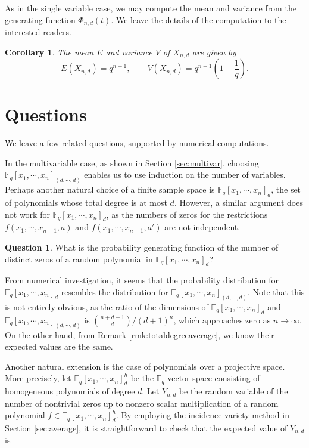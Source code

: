 \documentclass[12pt]{amsart}
\newtheorem{corollary}[theorem]{Corollary}
\theoremstyle{definition}
\newtheorem{question}[theorem]{Question}
\newcommand{\FF}{\mathbb{F} }
\begin{document}
As in the single variable case, we may compute the mean and variance from the generating function $\Phi_{n,d}(t)$. We leave the details of the computation to the interested readers. 

\begin{corollary}\label{corr: meanandvarn}
The mean $E$ and variance $V$ of $X_{n,d}$ are given by 
\[
    E(X_{n,d}) = q^{n-1}, \qquad V(X_{n,d}) = q^{n-1}\left(1 - \frac{1}{q}\right).
\]
\end{corollary}





\section{Questions}\label{sec:questions}

We leave a few related questions, supported by numerical computations. 

In the multivariable case, as shown in Section \ref{sec:multivar}, choosing $\FF_q[x_1, \cdots, x_n]_{(d, \cdots, d)}$ enables us to use induction on the number of variables. Perhaps another natural choice of a finite sample space is $\FF_q[x_1, \cdots, x_n]_d$, the set of polynomials whose total degree is at most $d$. However, a similar argument does not work for $\FF_q[x_1, \cdots, x_n]_d$, as the numbers of zeros for the restrictions $f(x_1, \cdots, x_{n-1}, a)$ and $f(x_1, \cdots, x_{n-1}, a')$ are not independent.

\begin{question}\label{que:totaldegree}
What is the probability generating function of the number of distinct zeros of a random polynomial in $\FF_q[x_1, \cdots, x_n]_d$?
\end{question}

From numerical investigation, it seems that the probability distribution for $\FF_q[x_1, \cdots, x_n]_d$ resembles the distribution for $\FF_q[x_1, \cdots, x_n]_{(d, \cdots , d)}$. Note that this is not entirely obvious, as the ratio of the dimensions of $\FF_q[x_1, \cdots, x_n]_d$ and $\FF_q[x_1, \cdots, x_n]_{(d, \cdots, d)}$ is ${n +d -1 \choose d}/(d+1)^n$, which approaches zero as $n \to \infty$. On the other hand, from Remark \ref{rmk:totaldegreeaverage}, we know their expected values are the same.

Another natural extension is the case of polynomials over a projective space. More precisely, let $\FF_q[x_1, \cdots, x_n]_d^h$ be the $\FF_q$-vector space consisting of homogeneous polynomials of degree $d$. Let $Y_{n,d}$ be the random variable of the number of nontrivial zeros up to nonzero scalar multiplication of a random polynomial $f \in \FF_q[x_1, \cdots, x_n]_d^h$. By employing the incidence variety method in Section \ref{sec:average}, it is straightforward to check that the expected value of $Y_{n,d}$ is 
\end{document}
